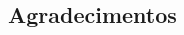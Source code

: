\thispagestyle{empty}
\begin{spacing}{1.0}
\chapter*{Agradecimentos}
    
    
\clearpage
\end{spacing}